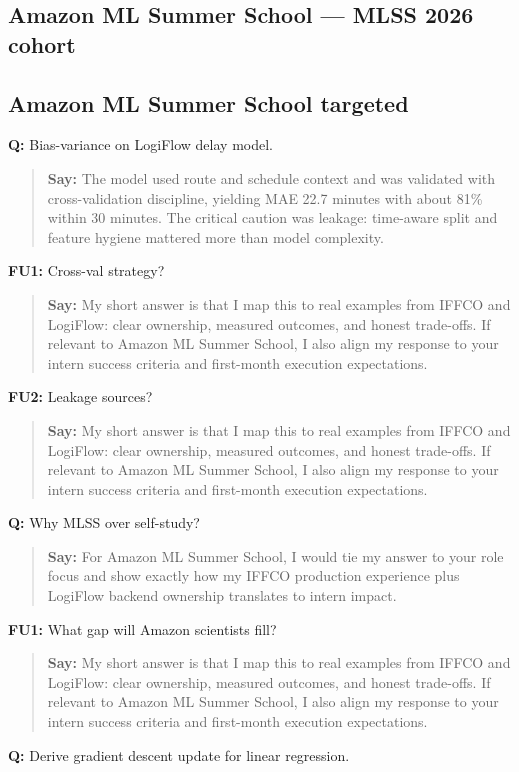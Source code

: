 \documentclass[9pt,a4paper]{article}
\begin{document}
\subsection{Amazon ML Summer School --- MLSS 2026 cohort}
\subsection{Amazon ML Summer School targeted}
\textbf{Q:} Bias-variance on LogiFlow delay model.

\begin{quote}\small\textbf{Say:} The model used route and schedule context and was validated with cross-validation discipline, yielding MAE 22.7 minutes with about 81\% within 30 minutes. The critical caution was leakage: time-aware split and feature hygiene mattered more than model complexity.\end{quote}
\vspace{2mm}
\textbf{FU1:} Cross-val strategy?

\begin{quote}\small\textbf{Say:} My short answer is that I map this to real examples from IFFCO and LogiFlow: clear ownership, measured outcomes, and honest trade-offs. If relevant to Amazon ML Summer School, I also align my response to your intern success criteria and first-month execution expectations.\end{quote}
\vspace{2mm}
\textbf{FU2:} Leakage sources?

\begin{quote}\small\textbf{Say:} My short answer is that I map this to real examples from IFFCO and LogiFlow: clear ownership, measured outcomes, and honest trade-offs. If relevant to Amazon ML Summer School, I also align my response to your intern success criteria and first-month execution expectations.\end{quote}
\vspace{2mm}
\textbf{Q:} Why MLSS over self-study?

\begin{quote}\small\textbf{Say:} For Amazon ML Summer School, I would tie my answer to your role focus and show exactly how my IFFCO production experience plus LogiFlow backend ownership translates to intern impact.\end{quote}
\vspace{2mm}
\textbf{FU1:} What gap will Amazon scientists fill?

\begin{quote}\small\textbf{Say:} My short answer is that I map this to real examples from IFFCO and LogiFlow: clear ownership, measured outcomes, and honest trade-offs. If relevant to Amazon ML Summer School, I also align my response to your intern success criteria and first-month execution expectations.\end{quote}
\vspace{2mm}
\textbf{Q:} Derive gradient descent update for linear regression.
\end{document}
